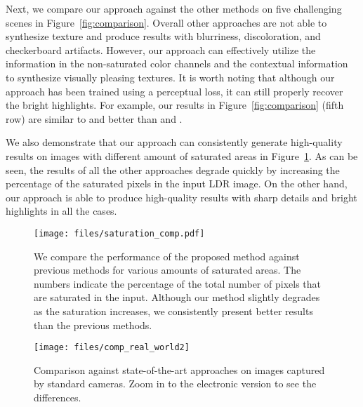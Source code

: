 Next, we compare our approach against the other methods on five challenging scenes in Figure~\ref{fig:comparison}. Overall other approaches are not able to synthesize texture and produce results with blurriness, discoloration, and checkerboard artifacts. However, our approach can effectively utilize the information in the non-saturated color channels and the contextual information to synthesize visually pleasing textures. It is worth noting that although our approach has been trained using a perceptual loss, it can still properly recover the bright highlights. For example, our results in Figure~\ref{fig:comparison} (fifth row) are similar to \citet{eilertsen2017hdr} and better than \citet{endo2017deep} and \citet{marnerides2018expandnet}.

We also demonstrate that our approach can consistently generate high-quality results on images with different amount of saturated areas in Figure~\ref{fig:ligh_saturation}. As can be seen, the results of all the other approaches degrade quickly by increasing the percentage of the saturated pixels in the input LDR image. On the other hand, our approach is able to produce high-quality results with sharp details and bright highlights in all the cases.

\begin{figure}
  \texttt{[image: files/saturation\_comp.pdf]}
  \vspace{-0.15in}
  \caption{We compare the performance of the proposed method against previous methods for various amounts of saturated areas. The numbers indicate the percentage of the total number of pixels that are saturated in the input. Although our method slightly degrades as the saturation increases, we consistently present better results than the previous methods.}
  \label{fig:ligh_saturation}
  \vspace{-0.20in}
\end{figure}

\begin{figure*}
  \texttt{[image: files/comp\_real\_world2]}
  \vspace{-0.30in}
  \caption{Comparison against state-of-the-art approaches on images captured by standard cameras. Zoom in to the electronic version to see the differences.}
  \vspace{-0.2in}
  \label{fig:real_world}
\end{figure*}

